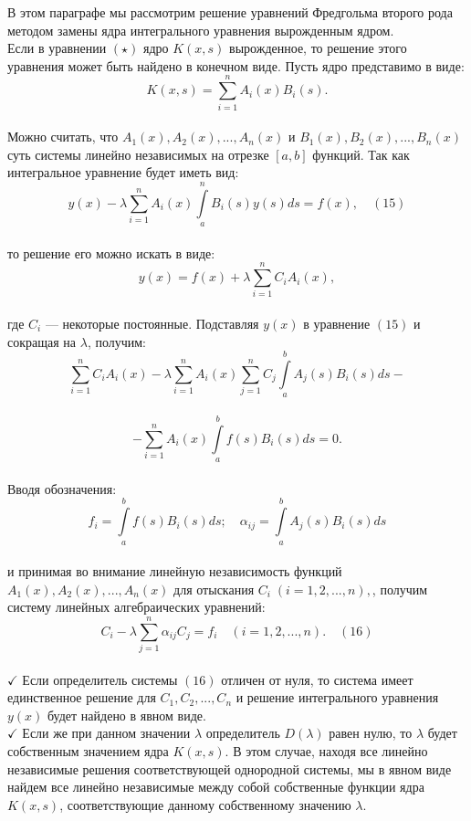 \documentclass[12pt]{article}
\begin{document}
В этом параграфе мы рассмотрим решение уравнений Фредгольма второго рода методом замены ядра интегрального уравнения вырожденным ядром. \\

Если в уравнении $ (\star) $ ядро $ K(x,s) $ вырожденное, то решение этого уравнения может быть найдено в конечном виде. Пусть ядро представимо в виде:\\
$$ K(x,s) = \sum\limits_{i=1}^n A_i(x)B_i(s) .$$\\
Можно считать, что $ A_1(x), A_2(x), ..., A_n(x) $ и $ B_1(x), B_2(x), ..., B_n(x) $ суть системы линейно независимых на отрезке $ [a,b] $ функций. Так как интегральное уравнение будет иметь вид:\\
$$ y(x) - \lambda\sum\limits_{i=1}^n A_i(x)\int\limits_a^nB_i(s)y(s) ds = f(x),  \quad (15) $$\\
то решение его можно искать в виде:\\
$$ y(x) = f(x) + \lambda \sum\limits_{i=1}^n C_iA_i(x) , $$\\
где $ C_i $ — некоторые постоянные. Подставляя $ y(x) $ в уравнение $ (15) $ и сокращая на $ \lambda $, получим: \\
$$ \sum\limits_{i=1}^n C_iA_i(x) - \lambda\sum\limits_{i=1}^n A_i(x) \sum\limits_{j=1}^nC_j\int\limits_a^bA_j(s)B_i(s)ds - $$\\
$$- \sum\limits_{i=1}^n A_i(x) \int\limits_a^b f(s) B_i(s)ds = 0 .$$\\
Вводя обозначения:\\
$$ f_i = \int\limits_a^b f(s)B_i(s)ds; \quad \alpha_{ij} = \int\limits_a^b A_j(s)B_i(s)ds $$\\
и принимая во внимание линейную независимость функций $ A_1(x), A_2(x), ..., A_n(x) $ для отыскания $ C_i \; (i=1,2, ..., n), $, получим систему линейных алгебраических уравнений:\\
$$ C_i - \lambda\sum\limits_{j=1}^n \alpha_{ij}C_j = f_i \quad (i=1,2, ..., n). \quad (16)$$ \\

$ \checkmark $ Если определитель системы $ (16) $ отличен от нуля, то система имеет единственное решение для $ C_1, C_2, ..., C_n $ и решение интегрального уравнения $ y(x) $ будет найдено в явном виде.\\

$ \checkmark $ Если же при данном значении $ \lambda $ определитель $ D(\lambda) $ равен нулю, то $ \lambda $ будет собственным значением ядра $ K(x,s) $. В этом случае, находя все линейно независимые решения соответствующей однородной системы, мы в явном виде найдем все линейно независимые между собой собственные функции ядра  $ K(x,s) $, соответствующие данному собственному значению $ \lambda $.\\ 
\end{document}
